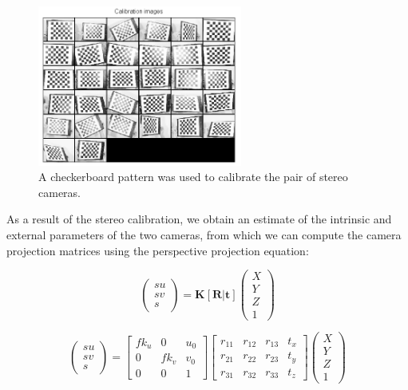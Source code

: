 \documentclass[11pt]{report}
\newcommand{\vect}[1]{\mathbf{#1}}
\begin{document}
\begin{figure}[htbp!]
\centering
\includegraphics[width=0.6\textwidth]{img/checkerboard}
	\caption{A checkerboard pattern was used to calibrate the pair of stereo cameras.}
	\label{fig:checkerboard}
\end{figure}

As a result of the stereo calibration, we obtain an estimate of the intrinsic and external parameters of the two cameras, from which we can compute the camera projection matrices using the perspective projection equation:

\begin{equation*}
\label{qrdecomp}
	\left(\!
    \begin{array}{c}
      su \\
      sv \\
      s
    \end{array}
  	\!\right) =
  \vect{K}[\vect{R}|\vect{t}]
    \left(\!
    \begin{array}{c}
      X \\
      Y \\
      Z \\
      1
    \end{array}
    \!\right) 		 
\end{equation*}

\begin{equation*}
\left(\!
    \begin{array}{c}
      su \\
      sv \\
      s
    \end{array}
  	\!\right) =
  \begin{bmatrix}
       fk_u & 0 & u_0 \\[0.3em]
       0 & fk_v & v_0 \\[0.3em]
       0 & 0 & 1
  \end{bmatrix}
    \begin{bmatrix}
       r_{11} & r_{12} & r_{13} & t_x \\[0.3em]
       r_{21} & r_{22} & r_{23} & t_y \\[0.3em]
       r_{31} & r_{32} & r_{33} & t_z
  \end{bmatrix}
    \left(\!
    \begin{array}{c}
      X \\
      Y \\
      Z \\
      1
    \end{array}
    \!\right)
\end{equation*}
\end{document}
